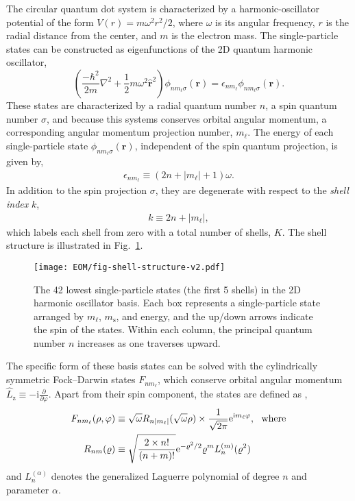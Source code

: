 \documentclass[thesis.tex]{subfiles}
\begin{document}
The circular quantum dot system is characterized by a harmonic-oscillator potential of the form $V(r) = m \omega^2r^2 / 2$, where $\omega$ is its angular frequency, $r$ is the radial distance from the center, and $m$ is the electron mass.  The single-particle states can be constructed as eigenfunctions of the 2D quantum harmonic oscillator,
\begin{equation} \label{eq:2d_ho}
  \left(\frac{-\hbar^{2}}{2m}\nabla^{2} + \frac{1}{2} m\omega^{2}\hat{\bm{r}}^2\right)\phi_{n m_{\ell} \sigma}(\mathbf{r}) = \epsilon_{n m_{\ell}}\phi_{n m_{\ell} \sigma}(\mathbf{r}).
\end{equation}
These states are characterized by a radial quantum number $n$, a spin quantum number $\sigma$, and because this systems conserves orbital angular momentum, a corresponding angular momentum projection number, $m_{\ell}$.  The energy of each single-particle state $\phi_{n m_{\ell} \sigma}(\mathbf{r})$, independent of the spin quantum projection, is given by,
\begin{align} \label{eq:energysingleparticlestate}
  \epsilon_{n m_{\ell}} \equiv (2 n + |m_\ell| + 1) \omega.
\end{align}
In addition to the spin projection $\sigma$, they are degenerate with respect to the \textit{shell index} $k$,
\begin{align} \label{eq:shell_index}
  k \equiv 2 n + |m_\ell|,
\end{align}
which labels each shell from zero with a total number of shells, $K$.  The shell structure is illustrated in Fig.\ \ref{fig:qd-shell-structure}.
\begin{figure}[h]
  \centering
  \texttt{[image: EOM/fig-shell-structure-v2.pdf]}
  \caption{The 42 lowest single-particle states (the first 5 shells) in the 2D harmonic oscillator basis.  Each box represents a single-particle state arranged by $m_\ell$, $m_{\mathrm{s}}$, and energy, and the up/down arrows indicate the spin of the states.  Within each column, the principal quantum number $n$ increases as one traverses upward.}
  \label{fig:qd-shell-structure}
\end{figure}

The specific form of these basis states can be solved with the cylindrically symmetric Fock--Darwin states $F_{n m_{\ell}}$, which conserve orbital angular momentum $\hat{L}_{\mathrm{z}} \equiv -\mathrm{i} \frac{\partial}{\partial \varphi}$.  Apart from their spin component, the states are defined as \cite{lohne2010coupled},
\begin{align}
  F_{n m_{\ell}}(\rho, \varphi) &\equiv \sqrt\omega R_{n |m_\ell|}(\sqrt \omega \rho) \times \frac{1}{\sqrt{2 \pi}} \mathrm{e}^{\mathrm{i} m_\ell \varphi} \label{eq:fockdarwin},\ \ \text{where} \\
  R_{n m}(\varrho) &\equiv \sqrt{\frac{2 \times n!}{(n + m)!}} \mathrm{e}^{-\varrho^2 / 2} \varrho^m L_n^{(m)}(\varrho^2) \notag
\end{align}
and $L_n^{(\alpha)}$ denotes the generalized Laguerre polynomial \cite{NIST:DLMF} of degree $n$ and parameter $\alpha$.
\end{document}
